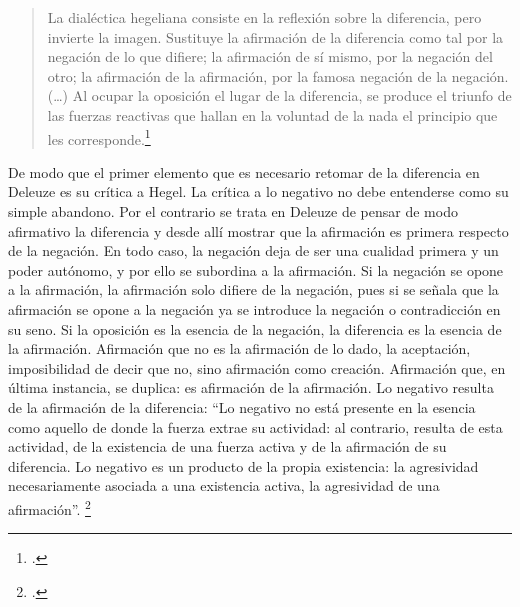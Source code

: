\begin{quote}
La dialéctica hegeliana consiste en la reflexión sobre la diferencia, pero invierte la imagen. Sustituye la afirmación de la diferencia como tal por la negación de lo que difiere; la afirmación de sí mismo, por la negación del otro; la afirmación de la afirmación, por la famosa negación de la negación. (\ldots) Al ocupar la oposición el lugar de la diferencia, se produce el triunfo de las fuerzas reactivas que hallan en la voluntad de la nada el principio que les corresponde.\footcite[272]{@6975-DELEUZE1998}
\end{quote}

De modo que el primer elemento que es necesario retomar de la diferencia en Deleuze es su crítica a Hegel. La crítica a lo negativo no debe entenderse como su simple abandono. Por el contrario se trata en Deleuze de pensar de modo afirmativo la diferencia y desde allí mostrar que la afirmación es primera respecto de la negación. En todo caso, la negación deja de ser una cualidad primera y un poder autónomo, y por ello se subordina a la afirmación. Si la negación se opone a la afirmación, la afirmación solo difiere de la negación, pues si se señala que la afirmación se opone a la negación ya se introduce la negación o contradicción en su seno. Si la oposición es la esencia de la negación, la diferencia es la esencia de la afirmación. Afirmación que no es la afirmación de lo dado, la aceptación, imposibilidad de decir que no, sino afirmación como creación. Afirmación que, en última instancia, se duplica: es afirmación de la afirmación. Lo negativo resulta de la afirmación de la diferencia: \enquote{Lo negativo no está presente en la esencia como aquello de donde la fuerza extrae su actividad: al contrario, resulta de esta actividad, de la existencia de una fuerza activa y de la afirmación de su diferencia. Lo negativo es un producto de  \linebreak la propia existencia: la agresividad necesariamente asociada a una existencia activa, la agresividad de una afirmación}. \footcite[17]{@6975-DELEUZE1998}

